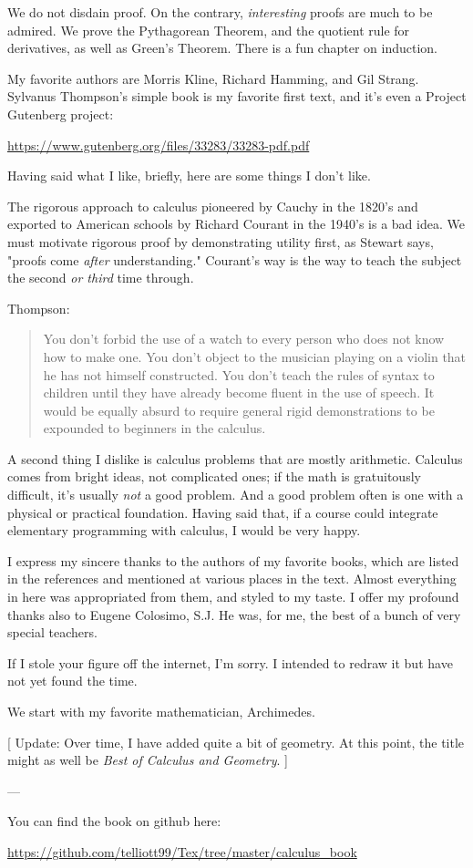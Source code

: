 \documentclass[11pt, oneside]{article}
\begin{document}
We do not disdain proof.  On the contrary, \emph{interesting} proofs are much to be admired.  We prove the Pythagorean Theorem, and the quotient rule for derivatives, as well as Green's Theorem.  There is a fun chapter on induction.

My favorite authors are Morris Kline, Richard Hamming, and Gil Strang.  Sylvanus Thompson's simple book is my favorite first text, and it's even a Project Gutenberg project:

\url{https://www.gutenberg.org/files/33283/33283-pdf.pdf}

Having said what I like, briefly, here are some things I don't like.

The rigorous approach to calculus pioneered by Cauchy in the 1820's and exported to American schools by Richard Courant in the 1940's is a bad idea.  We must motivate rigorous proof by demonstrating utility first, as Stewart says, "proofs come \emph{after} understanding."  Courant's way is the way to teach the subject the second  \emph{or third} time through.

Thompson:

\begin{quote}
You don't forbid the use of a watch to every person who does not know how to make one. You don't object to the musician playing on a violin that he has not himself constructed. You don't teach the rules of syntax to children until they have already become fluent in the use of speech. It would be equally absurd to require general rigid demonstrations to be expounded to beginners in the calculus.\end{quote}

A second thing I dislike is calculus problems that are mostly arithmetic.  Calculus comes from bright ideas, not complicated ones;  if the math is gratuitously difficult, it's usually \emph{not} a good problem.  And a good problem often is one with a physical or practical foundation.  Having said that, if a course could integrate elementary programming with calculus, I would be very happy.

I express my sincere thanks to the authors of my favorite books, which are listed in the references and mentioned at various places in the text.  Almost everything in here was appropriated from them, and styled to my taste.  I offer my profound thanks also to Eugene Colosimo, S.J.  He was, for me, the best of a bunch of very special teachers.

If I stole your figure off the internet, I'm sorry.  I intended to redraw it but have not yet found the time.  

We start with my favorite mathematician, Archimedes.

[ Update:  Over time, I have added quite a bit of geometry.  At this point, the title might as well be \emph{Best of Calculus and Geometry}. ]

---

You can find the book on github here:

\url{https://github.com/telliott99/Tex/tree/master/calculus_book}
\end{document}
